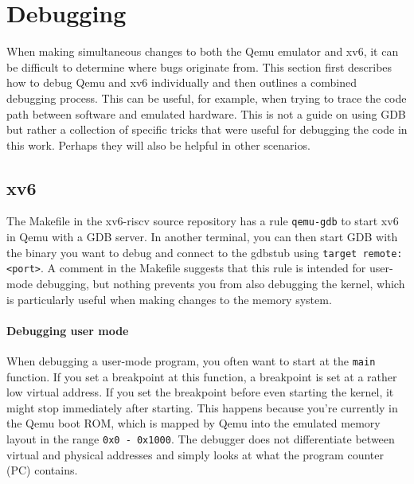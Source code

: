 


\section{Debugging}
When making simultaneous changes to both the Qemu emulator and xv6, it can be difficult to determine where bugs originate from. This section first describes how to debug Qemu and xv6 individually and then outlines a combined debugging process. This can be useful, for example, when trying to trace the code path between software and emulated hardware. This is not a guide on using GDB but rather a collection of specific tricks that were useful for debugging the code in this work. Perhaps they will also be helpful in other scenarios.

\subsection{xv6}
The Makefile in the xv6-riscv source repository has a rule \texttt{qemu-gdb} to start xv6 in Qemu with a GDB server. In another terminal, you can then start GDB with the binary you want to debug and connect to the gdbstub using \texttt{target remote:<port>}. A comment in the Makefile suggests that this rule is intended for user-mode debugging, but nothing prevents you from also debugging the kernel, which is particularly useful when making changes to the memory system.

\paragraph{Debugging user mode} When debugging a user-mode program, you often want to start at the \texttt{main} function. If you set a breakpoint at this function, a breakpoint is set at a rather low virtual address. If you set the breakpoint before even starting the kernel, it might stop immediately after starting. This happens because you're currently in the Qemu boot ROM, which is mapped by Qemu into the emulated memory layout in the range \texttt{0x0 - 0x1000}. The debugger does not differentiate between virtual and physical addresses and simply looks at what the program counter (PC) contains.

